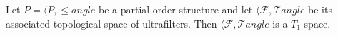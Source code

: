 Let $P = \langle P, \leq 
angle$ be a partial order structure and let $\langle \mathcal{F}, \mathcal{T} 
angle$ be its associated topological space of ultrafilters. Then $\langle \mathcal{F}, \mathcal{T} 
angle$ is a $T_1$-space.
